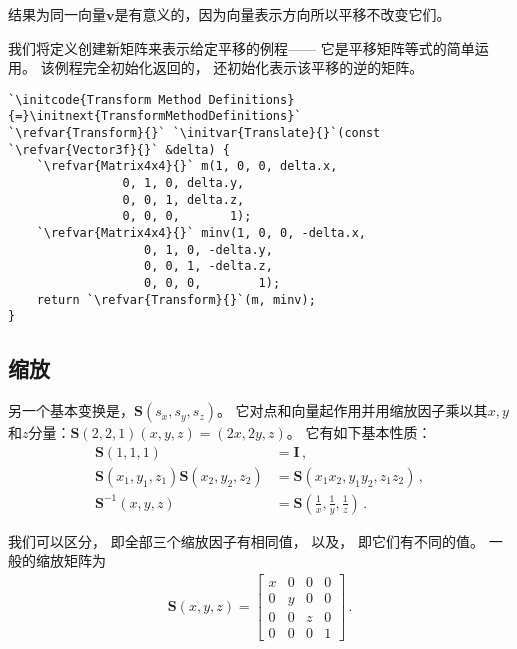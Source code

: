 结果为同一向量$\bm v$是有意义的，因为向量表示方向所以平移不改变它们。

我们将定义创建新矩阵来表示给定平移的例程——
它是平移矩阵等式的简单运用。
该例程完全初始化返回的，
还初始化表示该平移的逆的矩阵。
\begin{lstlisting}
`\initcode{Transform Method Definitions}{=}\initnext{TransformMethodDefinitions}`
`\refvar{Transform}{}` `\initvar{Translate}{}`(const `\refvar{Vector3f}{}` &delta) {
    `\refvar{Matrix4x4}{}` m(1, 0, 0, delta.x,
                0, 1, 0, delta.y,
                0, 0, 1, delta.z, 
                0, 0, 0,       1);
    `\refvar{Matrix4x4}{}` minv(1, 0, 0, -delta.x,
                   0, 1, 0, -delta.y,
                   0, 0, 1, -delta.z, 
                   0, 0, 0,        1);
    return `\refvar{Transform}{}`(m, minv);
}
\end{lstlisting}

\subsection{缩放}\label{sub:缩放}
另一个基本变换是，$\bm S(s_x,s_y,s_z)$。
它对点和向量起作用并用缩放因子乘以其$x,y$和$z$分量：$\bm S(2,2,1)(x,y,z)=(2x,2y,z)$。
它有如下基本性质：
\begin{align*}
    \bm S(1,1,1)                         & =\bm I\, ,                                                 \\
    \bm S(x_1,y_1,z_1)\bm S(x_2,y_2,z_2) & =\bm S(x_1x_2,y_1y_2,z_1z_2)\, ,                           \\
    \bm S^{-1}(x,y,z)                    & =\bm S\left(\frac{1}{x},\frac{1}{y},\frac{1}{z}\right)\, .
\end{align*}

我们可以区分，
即全部三个缩放因子有相同值，
以及，
即它们有不同的值。
一般的缩放矩阵为
\begin{align*}
    \bm S(x,y,z)=\left[
        \begin{array}{cccc}
            x & 0 & 0 & 0 \\
            0 & y & 0 & 0 \\
            0 & 0 & z & 0 \\
            0 & 0 & 0 & 1
        \end{array}
        \right]\, .
\end{align*}

